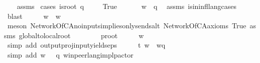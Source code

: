 \begin{isabellebody}
\ \ %
\endisadelimproof
%
\isatagproof
{}\isamarkupfalse%
\ assms\isanewline
{}\isamarkupfalse%
\ {\isacharparenleft}{\kern0pt}cases\ {\isachardoublequoteopen}is{\isacharunderscore}{\kern0pt}root\ q{\isachardoublequoteclose}{\isacharparenright}{\kern0pt}\ \isanewline
\ \ \isamarkupfalse%
\ True\ %
\isanewline
\ \ \isamarkupfalse%
\ \isamarkupfalse%
\ {\isachardoublequoteopen}w\ {\isasymin}\ {\isasymL}{\isacharparenleft}{\kern0pt}q{\isacharparenright}{\kern0pt}{\isachardoublequoteclose}\ \isamarkupfalse%
\ assms{\isacharparenleft}{\kern0pt}{}{\isacharparenright}{\kern0pt}\ is{\isacharunderscore}{\kern0pt}in{\isacharunderscore}{\kern0pt}infl{\isacharunderscore}{\kern0pt}lang{\isachardot}{\kern0pt}cases\ \isamarkupfalse%
\ blast\isanewline
\ \ \isamarkupfalse%
\ \isamarkupfalse%
\ {\isachardoublequoteopen}w\ {\isacharequal}{\kern0pt}\ w{\isasymdown}\isactrlsub {\isacharbang}{\kern0pt}{\isachardoublequoteclose}\ \ \isamarkupfalse%
\ {\isacharparenleft}{\kern0pt}meson\ NetworkOfCA{\isachardot}{\kern0pt}no{\isacharunderscore}{\kern0pt}inputs{\isacharunderscore}{\kern0pt}implies{\isacharunderscore}{\kern0pt}only{\isacharunderscore}{\kern0pt}sends{\isacharunderscore}{\kern0pt}alt\ NetworkOfCA{\isacharunderscore}{\kern0pt}axioms\ True\ assms{\isacharparenleft}{\kern0pt}{}{\isacharparenright}{\kern0pt}\ global{\isacharunderscore}{\kern0pt}to{\isacharunderscore}{\kern0pt}local{\isacharunderscore}{\kern0pt}root\isanewline
\ \ \ \ \ \ \ \ p{\isacharunderscore}{\kern0pt}root{\isacharparenright}{\kern0pt}\isanewline
\ \ \isamarkupfalse%
\ \isamarkupfalse%
\ {\isachardoublequoteopen}w{\isasymdown}\isactrlsub {\isacharquery}{\kern0pt}\ {\isacharequal}{\kern0pt}\ {\isasymepsilon}{\isachardoublequoteclose}\ \ \isamarkupfalse%
\ {\isacharparenleft}{\kern0pt}simp\ add{\isacharcolon}{\kern0pt}\ output{\isacharunderscore}{\kern0pt}proj{\isacharunderscore}{\kern0pt}input{\isacharunderscore}{\kern0pt}yields{\isacharunderscore}{\kern0pt}eps{\isacharparenright}{\kern0pt}\isanewline
\ \ \isamarkupfalse%
\ \isamarkupfalse%
\ t{}{\isacharcolon}{\kern0pt}\ {\isachardoublequoteopen}w\ {\isacharequal}{\kern0pt}\ w{\isasymdown}\isactrlsub q{\isachardoublequoteclose}\ \isamarkupfalse%
\ {\isacharparenleft}{\kern0pt}simp\ add{\isacharcolon}{\kern0pt}\ {\isacartoucheopen}w\ {\isasymin}\ {\isasymL}\ q{\isacartoucheclose}\ w{\isacharunderscore}{\kern0pt}in{\isacharunderscore}{\kern0pt}peer{\isacharunderscore}{\kern0pt}lang{\isacharunderscore}{\kern0pt}impl{\isacharunderscore}{\kern0pt}p{\isacharunderscore}{\kern0pt}actor{\isacharparenright}{\kern0pt}\isanewline

\end{isabellebody}
